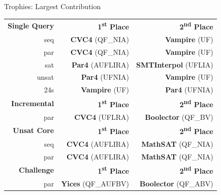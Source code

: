 \documentclass[10pt]{beamer}
\newcommand{\orange}[1]{\textcolor{mLightBrown}{#1}}
\begin{document}
  \begin{frame}{Trophies: Largest Contribution}

    \begin{tabular}{rrr}
      \hline
      \textbf{Single Query}
      & \textbf{1\textsuperscript{st} Place}
      & \textbf{2\textsuperscript{nd} Place} \\
      seq   & \textbf{\orange{CVC4}} (QF\_NIA)  & \textbf{Vampire} (UF) \\
      par   & \textbf{\orange{CVC4}} (QF\_NIA)  & \textbf{Vampire} (UF) \\
      sat   & \textbf{\orange{Par4}} (AUFLIRA)  & \textbf{SMTInterpol} (UFLIA) \\
      unsat & \textbf{\orange{Par4}} (UFNIA)    & \textbf{Vampire} (UF) \\
      24s   & \textbf{\orange{Vampire}} (UF)    & \textbf{Par4} (UFNIA) \\
      \hline
      \hline

      \textbf{Incremental}
      & \textbf{1\textsuperscript{st} Place}
      & \textbf{2\textsuperscript{nd} Place} \\
      par &  \textbf{\orange{CVC4}} (UFLRA) & \textbf{Boolector} (QF\_BV) \\
      \hline
      \hline

      \textbf{Unsat Core}
      & \textbf{1\textsuperscript{st} Place}
      & \textbf{2\textsuperscript{nd} Place} \\
      seq & \textbf{\orange{CVC4}} (AUFLIRA) & \textbf{MathSAT} (QF\_NIA) \\
      par & \textbf{\orange{CVC4}} (AUFLIRA) & \textbf{MathSAT} (QF\_NIA) \\
      \hline
      \hline

      \textbf{Challenge}
      & \textbf{1\textsuperscript{st} Place}
      & \textbf{2\textsuperscript{nd} Place} \\
      par & \textbf{\orange{Yices}} (QF\_AUFBV) & \textbf{Boolector} (QF\_ABV) \\
      \hline

    \end{tabular}
  \end{frame}
\end{document}

